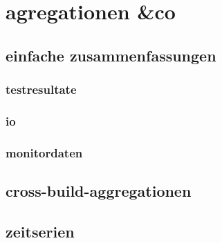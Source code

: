 \chapter{agregationen \&co}
\section{einfache zusammenfassungen}
\subsection{testresultate}
\subsection{io}
\subsection{monitordaten}
\section{cross-build-aggregationen}
\section{zeitserien}


